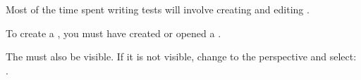 
Most of the time spent writing tests will involve creating and editing \gdcases{}. 

To create a \gdcase{}, you must have created or opened a \gdproject{} . 

The \gdtestcasebrowser{} must also be visible. If it is not visible, change to the \specpersp{} perspective and select:\\
.

